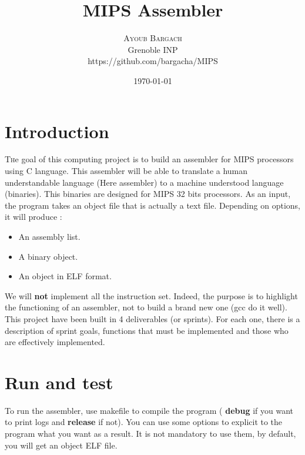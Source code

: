 \documentclass[twoside,twocolumn]{article}
\title{MIPS Assembler} %
\author{%
\textsc{Ayoub Bargach} \\[1ex] %
\normalsize Grenoble INP \\ %
\normalsize https://github.com/bargacha/MIPS %
}
\date{\today} %
\begin{document}
\maketitle


\section{Introduction}

\lettrine[nindent=0em,lines=3]{T} he goal of this computing project is to build an assembler for MIPS processors using C language. This assembler will be able to translate a human understandable language (Here assembler) to a machine understood language (binaries). This binaries are designed for MIPS 32 bits processors. As an input, the program takes an object file that is actually a text file. Depending on options, it will produce :

\begin{itemize}

  \item An assembly list.
  \item A binary object.
  \item An object in ELF format.

\end{itemize}

We will \textbf{not} implement all the instruction set. Indeed, the purpose is to highlight the functioning of an assembler, not to build a brand new one (gcc do it well). This project have been built in 4 deliverables (or sprints). For each one, there is a description of sprint goals, functions that must be implemented and those who are effectively implemented.





\section{Run and test}

To run the assembler, use makefile to compile the program (\textbf{ debug } if you want to print logs and \textbf{ release } if not). You can use some options to explicit to the program what you want as a result. It is not mandatory to use them, by default, you will get an object ELF file.
\end{document}

